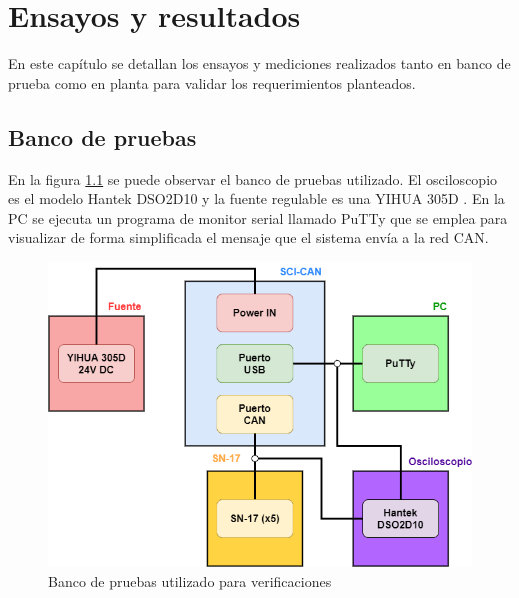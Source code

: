 
\chapter{Ensayos y resultados} %

\label{Chapter4} %

En este capítulo se detallan los ensayos y mediciones realizados tanto en banco de prueba como en planta para validar los requerimientos planteados. 


\section{Banco de pruebas}

En la figura \ref{fig:Banco} se puede observar el banco de pruebas utilizado. El osciloscopio es el modelo Hantek DSO2D10 \citep{web_hantek} y la fuente regulable es una YIHUA 305D \citep{web_yihua}. En la PC se ejecuta un programa de monitor serial llamado PuTTy \citep{web_putty} que se emplea para visualizar de forma simplificada el mensaje que el sistema envía a la red CAN.

\begin{figure}[htbp]
	\centering
	\includegraphics[scale=0.5]{./Figures/banco_pruebas.png}
	\caption{Banco de pruebas utilizado para verificaciones}
	\label{fig:Banco}
\end{figure}


